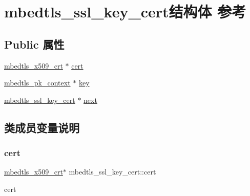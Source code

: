 \hypertarget{structmbedtls__ssl__key__cert}{}\section{mbedtls\+\_\+ssl\+\_\+key\+\_\+cert结构体 参考}
\label{structmbedtls__ssl__key__cert}
\subsection*{Public 属性}
\begin{DoxyCompactItemize}
\item 
\hyperlink{structmbedtls__x509__crt}{mbedtls\+\_\+x509\+\_\+crt} $\ast$ \hyperlink{structmbedtls__ssl__key__cert_a85f7a889f740577ad11cd50adbef09a8}{cert}
\item 
\hyperlink{structmbedtls__pk__context}{mbedtls\+\_\+pk\+\_\+context} $\ast$ \hyperlink{structmbedtls__ssl__key__cert_a36357248c58a208bf8e820b75f2f118f}{key}
\item 
\hyperlink{structmbedtls__ssl__key__cert}{mbedtls\+\_\+ssl\+\_\+key\+\_\+cert} $\ast$ \hyperlink{structmbedtls__ssl__key__cert_ac8969b0a63df001f997cab96154db160}{next}
\end{DoxyCompactItemize}


\subsection{类成员变量说明}
\mbox{\label{structmbedtls__ssl__key__cert_a85f7a889f740577ad11cd50adbef09a8}} 
\subsubsection{\texorpdfstring{cert}{cert}}
{\footnotesize\ttfamily \hyperlink{structmbedtls__x509__crt}{mbedtls\+\_\+x509\+\_\+crt}$\ast$ mbedtls\+\_\+ssl\+\_\+key\+\_\+cert\+::cert}

cert \mbox{\label{structmbedtls__ssl__key__cert_a36357248c58a208bf8e820b75f2f118f}} 
